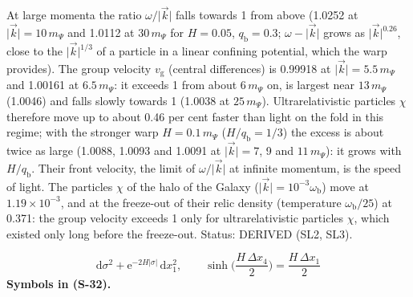 \documentclass[
  10pt,
]{article}
\begin{document}
At large momenta the ratio \(\omega/\lvert\vec k\rvert\) falls towards 1
from above (1.0252 at \(\lvert\vec k\rvert = 10\,m_\Psi\) and 1.0112 at
\(30\,m_\Psi\) for \(H = 0.05\), \(q_{\mathrm{b}} = 0.3\);
\(\omega - \lvert\vec k\rvert\) grows as \(\lvert\vec k\rvert^{0.26}\),
close to the \(\lvert\vec k\rvert^{1/3}\) of a particle in a linear
confining potential, which the warp provides). The group velocity
\(v_{\mathrm{g}}\) (central differences) is 0.99918 at
\(\lvert\vec k\rvert = 5.5\,m_\Psi\) and 1.00161 at \(6.5\,m_\Psi\): it
exceeds 1 from about \(6\,m_\Psi\) on, is largest near \(13\,m_\Psi\)
(1.0046) and falls slowly towards 1 (1.0038 at \(25\,m_\Psi\)).
Ultrarelativistic particles \(\chi\) therefore move up to about 0.46 per
cent faster than light on the fold in this regime; with the stronger
warp \(H = 0.1\,m_\Psi\) (\(H/q_{\mathrm{b}} = 1/3\)) the excess is
about twice as large (1.0088, 1.0093 and 1.0091 at
\(\lvert\vec k\rvert = 7\), 9 and \(11\,m_\Psi\)): it grows with
\(H/q_{\mathrm{b}}\). Their front velocity, the limit of
\(\omega/\lvert\vec k\rvert\) at infinite momentum, is the speed of
light. The particles \(\chi\) of the halo of the Galaxy
(\(\lvert\vec k\rvert = 10^{-3}\omega_{\mathrm{b}}\)) move at
\(1.19\times10^{-3}\), and at the freeze-out of their relic density
(temperature \(\omega_{\mathrm{b}}/25\)) at 0.371: the group velocity
exceeds 1 only for ultrarelativistic particles \(\chi\), which existed
only long before the freeze-out. Status: DERIVED (SL2, SL3).

\[
\mathrm{d}\sigma^2 + \mathrm{e}^{-2H\lvert\sigma\rvert}\,\mathrm{d}x_1^2,\qquad
\sinh\Big(\frac{H\,\Delta x_4}{2}\Big) = \frac{H\,\Delta x_1}{2} \tag{S-32}
\] \textbf{Symbols in (S-32).}
\end{document}
